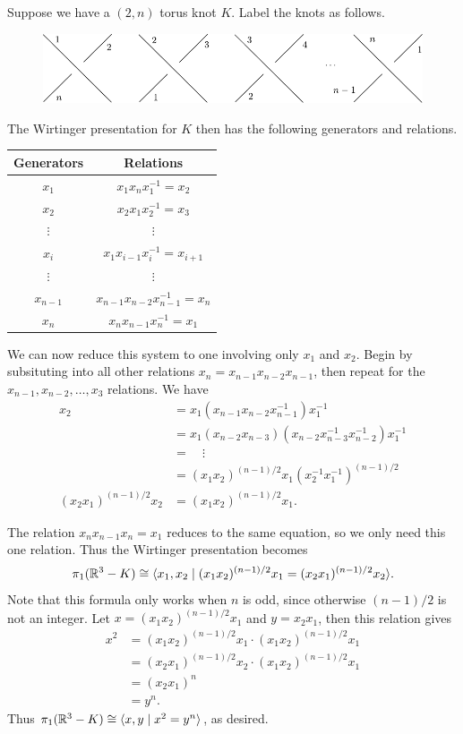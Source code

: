 \documentclass[twoside,10pt]{article}
\begin{document}
Suppose we have a $(2,n)$ torus knot $K$. Label the knots as follows.

\begin{figure}[H]
	\centering
	\includegraphics[scale=1]{fig/3a.pdf}
\end{figure}

The Wirtinger presentation for $K$ then has the following generators and relations.
\begin{center}
\begin{tabular}{c | c}
	Generators & Relations \\
	\hline
	$x_1$ & $x_1 x_n x_1^{-1} = x_2$ \\
	$x_2$ & $x_2 x_1 x_2^{-1} = x_3$ \\
	$\vdots$ & $\vdots$ \\
	$x_i$ & $x_1 x_{i-1} x_{i}^{-1} = x_{i+1}$ \\
	$\vdots$ & $\vdots$ \\
	$x_{n-1}$ & $x_{n-1}x_{n-2}x_{n-1}^{-1}=x_{n}$ \\
	$x_n$ & $x_{n}x_{n-1}x_{n}^{-1}= x_1$
\end{tabular}
\end{center}
We can now reduce this system to one involving only $x_1$ and $x_2$. Begin by subsituting into all other relations $x_{n}= x_{n-1}x_{n-2}x_{n-1}$, then repeat for the $x_{n-1}, x_{n-2}, \dots, x_{3}$ relations. We have
\begin{align*}
	x_{2} &= x_1 (x_{n-1}x_{n-2}x_{n-1}^{-1}) x_1^{-1} \\
	      &= x_1 (x_{n-2}x_{n-3}) (x_{n-2}x_{n-3}^{-1}x_{n-2}^{-1}) x_{1}^{-1} \\
	      &= \quad\vdots \\
	      &= (x_1x_2)^{(n-1)/2} x_1 (x_2^{-1}x_1^{-1})^{(n-1)/2} \\
	(x_2x_1)^{(n-1)/2} x_2 &= (x_1x_2)^{(n-1)/2} x_1.
\end{align*}

The relation $x_{n}x_{n-1}x_{n}=x_1$ reduces to the same equation, so we only need this one relation. Thus the Wirtinger presentation becomes
\[
	\pi_1(\mathbb{R}^{3}-K)	\cong \langle x_1, x_2 \;|\; (x_1x_2)^{(n-1)/2}x_1 = (x_2x_1)^{(n-1)/2}x_2 \rangle.
\] Note that this formula only works when $n$ is odd, since otherwise $(n-1)/2$ is not an integer. Let $x=(x_1x_2)^{(n-1)/2}x_1$ and $y = x_2x_1$, then this relation gives
\begin{align*}
	x^2 &= (x_1x_2)^{(n-1)/2}x_1 \cdot (x_1x_2)^{(n-1)/2}x_1 \\
	    &= (x_2x_1)^{(n-1)/2}x_2 \cdot (x_1x_2)^{(n-1)/2}x_1 \\
	    &= (x_2x_1)^{n} \\
	    &= y^{n}.
\end{align*}
Thus $\pi_1(\mathbb{R}^{3}-K) \cong \langle x,y \;|\; x^{2}=y^{n} \rangle$, as desired.
\end{document}
